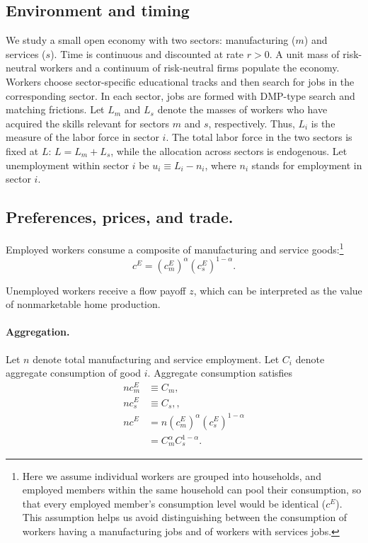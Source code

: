 \documentclass[12pt]{article} %
\theoremstyle{definition}
\begin{document}
\subsection{Environment and timing}
We study a small open economy with two sectors: manufacturing ($m$) and services ($s$). Time is continuous and discounted at rate $r>0$. A unit mass of risk-neutral workers and a continuum of risk-neutral firms populate the economy. Workers choose  sector-specific educational tracks and then search for jobs in the corresponding sector.
In each sector, jobs are formed with DMP-type search and matching frictions.   Let $L_m$ and $L_s$ denote the masses of workers who have acquired the skills relevant for sectors $m$ and $s$, respectively. Thus, $L_i$ is the measure of  the labor force in sector $i$.
The total labor force in the two sectors is fixed at $L$: $L = L_m+L_s$, while the allocation across sectors is endogenous. %
Let unemployment within sector $i$ be $u_i \equiv L_i-n_i$, where $n_i$ stands for employment in sector $i$. 



\subsection{Preferences, prices, and trade.} 

Employed workers consume a composite  of manufacturing and service goods:\footnote{Here we assume individual workers are grouped into households, and employed members within the same household can pool their consumption, so that every employed member's consumption level would be identical ($c^E$). This assumption helps us avoid distinguishing between the consumption of workers having a manufacturing jobs and of workers with services jobs.}
\begin{equation}
    c^E = (c^E_m)^{\alpha} (c^E_s)^{1-\alpha}.
    \label{eq:ce}
\end{equation}

Unemployed workers receive a flow payoff $z$, which can be interpreted as the value of nonmarketable home production. 

\paragraph{Aggregation.} Let $n$ denote total manufacturing and service employment. Let $C_i$ denote aggregate consumption of good $i$. Aggregate consumption satisfies
\begin{align*}
     n c_m^E & \equiv C_m, \nonumber \\
     n c_s^E &\equiv C_s, \nonumber,  \\
    nc^E &= n   (c^E_m)^{\alpha} (c^E_s)^{1-\alpha}\\
     & =  C_m^{\alpha} C_s^{1-\alpha}.
\end{align*}
\end{document}
